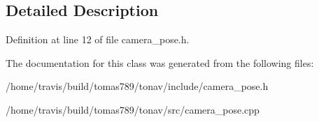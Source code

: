\subsection{Detailed Description}


Definition at line 12 of file camera\-\_\-pose.\-h.



The documentation for this class was generated from the following files\-:\begin{DoxyCompactItemize}
\item 
/home/travis/build/tomas789/tonav/include/camera\-\_\-pose.\-h\item 
/home/travis/build/tomas789/tonav/src/camera\-\_\-pose.\-cpp\end{DoxyCompactItemize}
